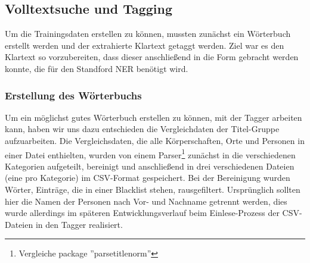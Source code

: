 \documentclass[a4paper]{article}
\begin{document}
\subsection{Volltextsuche und Tagging}
Um die Trainingsdaten erstellen zu können, mussten zunächst ein Wörterbuch erstellt werden und der extrahierte Klartext getaggt werden.
Ziel war es den Klartext so vorzubereiten, dass dieser anschließend in die Form gebracht werden konnte, die für den Standford NER benötigt wird.
\subsubsection{Erstellung des Wörterbuchs}
Um ein möglichst gutes Wörterbuch erstellen zu können, mit der Tagger arbeiten kann, haben wir uns dazu entschieden die Vergleichdaten der Titel-Gruppe aufzuarbeiten.
Die Vergleichsdaten, die alle Körperschaften, Orte und Personen in einer Datei enthielten, wurden von einem Parser\footnote{Vergleiche package ''parsetitlenorm''} zunächst in die verschiedenen Kategorien aufgeteilt, bereinigt und anschließend in drei verschiedenen Dateien (eine pro Kategorie) im CSV-Format gespeichert. Bei der Bereinigung wurden Wörter, Einträge, die in einer Blacklist stehen, rausgefiltert. Ursprünglich sollten hier die Namen der Personen nach Vor- und Nachname getrennt werden, dies wurde allerdings im späteren Entwicklungsverlauf beim Einlese-Prozess der CSV-Dateien in den Tagger realisiert.
\end{document}
